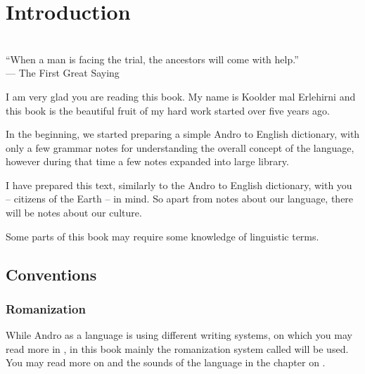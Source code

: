 \chapter{Introduction}
\label{ch:introduction}

\begin{flushright}\small
    \\
    ``When a man is facing the trial, the ancestors will come with help.''\\
    --- The First Great Saying\footnotemark
\end{flushright}\bigskip


 I am very glad you are reading this book. My name is
Koolder mal Erlehirni and this book is the beautiful fruit of my hard work
started over five years ago.

In the beginning, we started preparing a simple Andro to English dictionary,
with only a few grammar notes for understanding the overall concept of the
language, however during that time a few notes expanded into large library.

I have prepared this text, similarly to the Andro to English dictionary, with
you -- citizens of the Earth -- in mind. So apart from notes about our language,
there will be notes about our culture.

Some parts of this book may require some knowledge of linguistic terms.

\bigskip


\section{Conventions}

\subsection{Romanization}

While Andro as a language is using different writing systems, on which you may
read more in , in this book mainly the romanization system
called  will be used. You may read more on  and the
sounds of the language in the chapter on .

